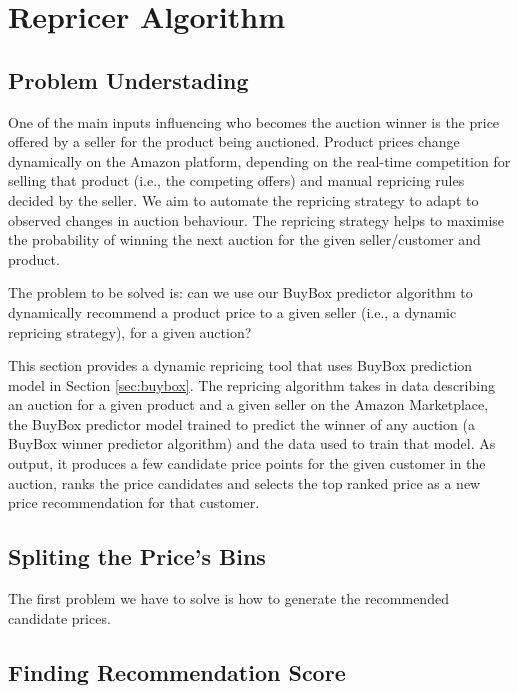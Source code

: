 \chapter{Repricer Algorithm}
\label{sec:repricer}

\section{Problem Understading}
\label{sec:rpproblem}

One of the main inputs influencing who becomes the auction winner is the price offered by a seller for the product being auctioned. Product prices change dynamically on the Amazon platform, depending on the real-time competition for selling that product (i.e., the competing offers) and manual repricing rules decided by the seller. We aim to automate the repricing strategy to adapt to observed changes in auction behaviour. The repricing strategy helps to maximise the probability of winning the next auction for the given seller/customer and product. 
 
The problem to be solved is: can we use our BuyBox predictor algorithm to dynamically recommend a product price to a given seller (i.e., a dynamic repricing strategy), for a given auction?

This section provides a dynamic repricing tool that uses BuyBox prediction model in Section \ref{sec:buybox}. The repricing algorithm takes in data describing an auction for a given product and a given seller on the Amazon Marketplace, the BuyBox predictor model trained to predict the winner of any auction (a BuyBox winner predictor algorithm) and the data used to train that model. As output, it produces a few candidate price points for the given customer in the auction, ranks the price candidates and selects the top ranked price as a new price recommendation for that customer.

\section{Spliting the Price's Bins}
\label{sec:spliting}

The first problem we have to solve is how to generate the recommended candidate prices.

\section{Finding Recommendation Score}
\label{sec:finalscore}

